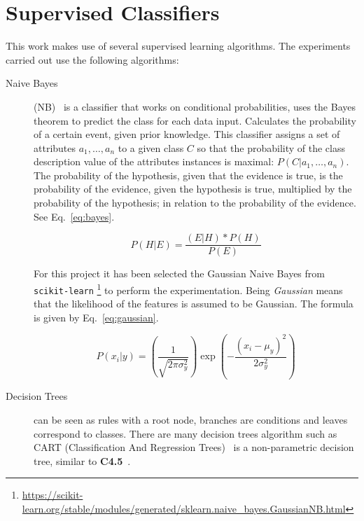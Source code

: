 \section{Supervised Classifiers}

This work makes use of several supervised learning algorithms. The 
experiments carried out use the following algorithms:

\begin{description}
    \item [Naive Bayes] (NB)~\cite{Mit97} is a classifier that works on 
	conditional probabilities, uses the Bayes theorem to predict the class for 
	each data input. Calculates the probability of a certain event, given prior 
	knowledge. This classifier assigns a set of attributes $a_{1}, \ldots, 
	a_{n}$ to a given class $C$ so that the probability of the class description 
	value of the attributes instances is maximal: $P(C|a_{1}, \ldots, a_n)$. The 
	probability of the hypothesis, given that the evidence is true, is the 
	probability of the evidence, given the hypothesis is true, multiplied by the 
	probability of the hypothesis; in relation to the probability of the 
	evidence. See Eq.~\ref{eq:bayes}.
    
    \begin{equation}\label{eq:bayes}
        P(H|E) = \frac{(E|H) * P(H)}{P(E)}
    \end{equation}
    
    For this project it has been selected the Gaussian Naive Bayes from 
	\texttt{scikit-learn}
	\footnote{\url{https://scikit-learn.org/stable/modules/generated/sklearn.naive_bayes.GaussianNB.html}} 
	to perform the experimentation. Being \textit{Gaussian} means that the 
	likelihood of the features is assumed to be Gaussian. The formula is given 
	by Eq.~\ref{eq:gaussian}.
    
    \begin{equation}\label{eq:gaussian}
        P(x_{i}|y)=(\frac{1}{\sqrt{2\pi \sigma^{2}_{y}}})\exp{(-\frac{(x_{i} - \mu _{y})^2}{2\sigma^{2}_{y}})}
    \end{equation}
    
    \item [Decision Trees] can be seen as rules with a root node, branches are 
	conditions and leaves correspond to classes. There are many decision trees 
	algorithm such as CART (Classification And Regression 
	Trees)~\cite{Breiman1984} is a non-parametric decision tree, similar to 
	\textbf{C4.5}~\cite{Quinlan1993}. 


\end{description}
